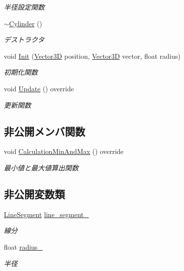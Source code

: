 \begin{DoxyCompactItemize}
\begin{DoxyCompactList}\small\item\em 半径設定関数 \end{DoxyCompactList}\item 
\mbox{\hyperlink{class_cylinder_a05ab556f0ae3cd6e99d9d1f3caca80b3}{$\sim$\+Cylinder}} ()
\begin{DoxyCompactList}\small\item\em デストラクタ \end{DoxyCompactList}\item 
void \mbox{\hyperlink{class_cylinder_ab7d8167ece18b76e324a06482d22dacb}{Init}} (\mbox{\hyperlink{class_vector3_d}{Vector3D}} position, \mbox{\hyperlink{class_vector3_d}{Vector3D}} vector, float radius)
\begin{DoxyCompactList}\small\item\em 初期化関数 \end{DoxyCompactList}\item 
void \mbox{\hyperlink{class_cylinder_a7b835c069d873b53d57fd01b9f44bacd}{Update}} () override
\begin{DoxyCompactList}\small\item\em 更新関数 \end{DoxyCompactList}\end{DoxyCompactItemize}
\subsection*{非公開メンバ関数}
\begin{DoxyCompactItemize}
\item 
void \mbox{\hyperlink{class_cylinder_ac8fb25627ff41e9ae265cd80bfbde03a}{Calculation\+Min\+And\+Max}} () override
\begin{DoxyCompactList}\small\item\em 最小値と最大値算出関数 \end{DoxyCompactList}\end{DoxyCompactItemize}
\subsection*{非公開変数類}
\begin{DoxyCompactItemize}
\item 
\mbox{\hyperlink{class_line_segment}{Line\+Segment}} \mbox{\hyperlink{class_cylinder_a29d1c6c61863d19f617287da9474f1c4}{line\+\_\+segment\+\_\+}}
\begin{DoxyCompactList}\small\item\em 線分 \end{DoxyCompactList}\item 
float \mbox{\hyperlink{class_cylinder_abba752e07b11b7bfd8fcce64a6d9b678}{radius\+\_\+}}
\begin{DoxyCompactList}\small\item\em 半径 \end{DoxyCompactList}\end{DoxyCompactItemize}
